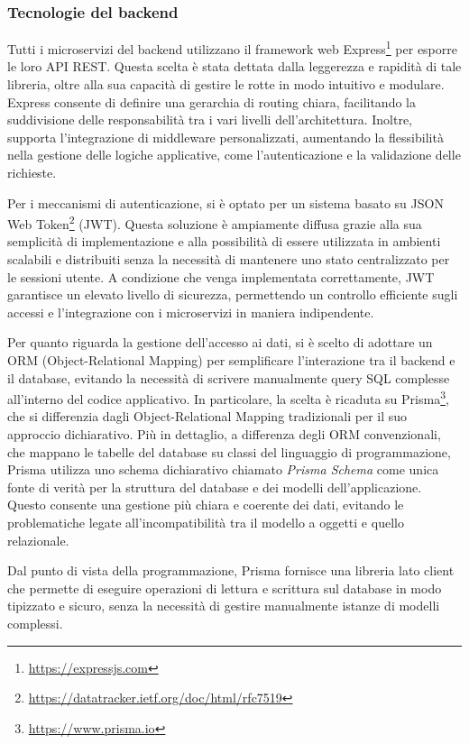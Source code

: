 \subsubsection{Tecnologie del backend}
Tutti i microservizi del backend utilizzano il framework web Express\footnote{\url{https://expressjs.com}} per esporre le loro API REST. Questa scelta è stata dettata dalla leggerezza e rapidità di tale libreria, oltre alla sua capacità di gestire le rotte in modo intuitivo e modulare. Express consente di definire una gerarchia di routing chiara, facilitando la suddivisione delle responsabilità tra i vari livelli dell'architettura. Inoltre, supporta l'integrazione di middleware personalizzati, aumentando la flessibilità nella gestione delle logiche applicative, come l'autenticazione e la validazione delle richieste.

Per i meccanismi di autenticazione, si è optato per un sistema basato su JSON Web Token\footnote{\url{https://datatracker.ietf.org/doc/html/rfc7519}} (JWT). Questa soluzione è ampiamente diffusa grazie alla sua semplicità di implementazione e alla possibilità di essere utilizzata in ambienti scalabili e distribuiti senza la necessità di mantenere uno stato centralizzato per le sessioni utente. A condizione che venga implementata correttamente, JWT garantisce un elevato livello di sicurezza, permettendo un controllo efficiente sugli accessi e l'integrazione con i microservizi in maniera indipendente.

Per quanto riguarda la gestione dell’accesso ai dati, si è scelto di adottare un ORM (Object-Relational Mapping) per semplificare l’interazione tra il backend e il database, evitando la necessità di scrivere manualmente query SQL complesse all’interno del codice applicativo. In particolare, la scelta è ricaduta su Prisma\footnote{\url{https://www.prisma.io}}, che si differenzia dagli Object-Relational Mapping tradizionali per il suo approccio dichiarativo. Più in dettaglio, a differenza degli ORM convenzionali, che mappano le tabelle del database su classi del linguaggio di programmazione, Prisma utilizza uno schema dichiarativo chiamato \textit{Prisma Schema} come unica fonte di verità per la struttura del database e dei modelli dell’applicazione. Questo consente una gestione più chiara e coerente dei dati, evitando le problematiche legate all'incompatibilità tra il modello a oggetti e quello relazionale.

Dal punto di vista della programmazione, Prisma fornisce una libreria lato client che permette di eseguire operazioni di lettura e scrittura sul database in modo tipizzato e sicuro, senza la necessità di gestire manualmente istanze di modelli complessi.

